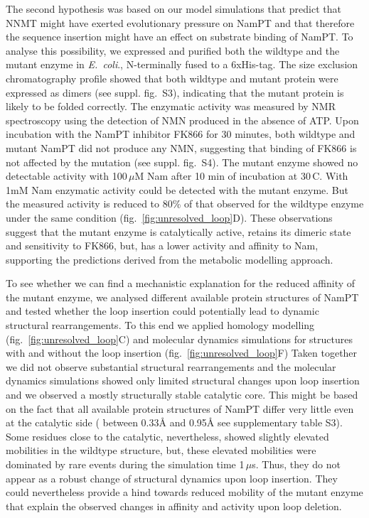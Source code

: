 The second hypothesis was  based on our model simulations that predict that NNMT might have exerted evolutionary pressure on  NamPT and that therefore the sequence insertion might have an effect on substrate binding of NamPT.  To analyse this possibility, we expressed and purified  both the wildtype and the mutant enzyme in \textit{E.~coli}., N-terminally fused to a 6xHis-tag. The size exclusion chromatography profile showed that both wildtype and mutant protein were expressed as dimers (see suppl. fig.~S3), indicating that the  mutant protein is likely to be folded correctly. The enzymatic activity was measured by NMR spectroscopy using the detection of NMN produced in the absence of ATP. Upon incubation with the NamPT inhibitor FK866 \cite{Hasmann2003} for 30 minutes, both wildtype and mutant NamPT did not produce any NMN, suggesting that binding of FK866 is not affected by the mutation (see suppl. fig.~S4). The mutant enzyme showed no detectable activity with 100\,$\mu$M  Nam after 10 min of incubation at 30\,\textdegree{}C. With 1mM Nam enzymatic activity could be detected with the mutant enzyme. But the measured activity is reduced to 80\% of that observed for the wildtype enzyme under the same condition (fig.~\ref{fig:unresolved_loop}D). These observations suggest that the mutant enzyme is catalytically active, retains its dimeric state and sensitivity to FK866, but, has a  lower activity and affinity to Nam, supporting the predictions derived from the metabolic modelling approach.

To see whether we can find a mechanistic explanation for the reduced affinity of the mutant enzyme, we analysed different available protein structures of NamPT and tested whether  the loop insertion could potentially lead to dynamic structural rearrangements. To this end we applied homology modelling (fig.~\ref{fig:unresolved_loop}C) and molecular dynamics simulations for structures with and without the loop insertion (fig.~\ref{fig:unresolved_loop}F) Taken together we did not observe substantial structural rearrangements and the molecular dynamics simulations showed only limited structural changes upon loop insertion and we observed a mostly structurally stable catalytic core. This might be based on the fact that  all available protein structures of NamPT differ very little even at the catalytic side ( between 0.33Å and 0.95Å see supplementary table S3). Some residues close to the catalytic, nevertheless, showed slightly elevated mobilities in the wildtype structure, but, these elevated mobilities were dominated by rare events during the simulation time 1\,$\mu$s. Thus, they do not appear as a robust change of structural dynamics upon loop insertion. They could nevertheless provide a hind towards reduced mobility of the mutant enzyme that explain the observed changes in affinity and activity upon loop deletion.




